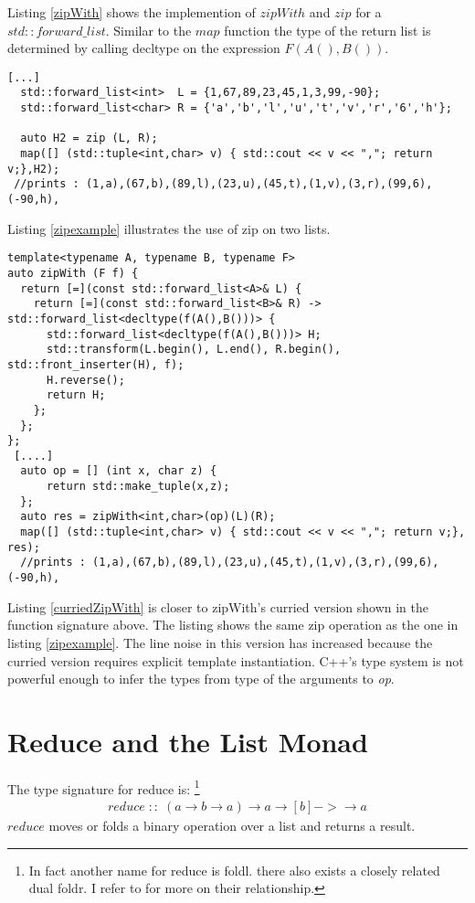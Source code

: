 \documentclass[12pt,fleqn]{article}
\begin{document}
Listing \ref{zipWith} shows the implemention of $zipWith$ and $zip$ for a $std::forward\_list$.
Similar to the $map$ function the type of the return list is determined by calling decltype on the expression $F(A(),B())$.
%
\begin{lstlisting}[caption=zipping two lists, label=zipexample ]
   [...]
  std::forward_list<int>  L = {1,67,89,23,45,1,3,99,-90};
  std::forward_list<char> R = {'a','b','l','u','t','v','r','6','h'};

  auto H2 = zip (L, R);
  map([] (std::tuple<int,char> v) { std::cout << v << ","; return v;},H2); 
 //prints : (1,a),(67,b),(89,l),(23,u),(45,t),(1,v),(3,r),(99,6),(-90,h),
\end{lstlisting}
Listing \ref{zipexample} illustrates the use of zip on two lists.
%
\begin{lstlisting}[caption=curried version of zipWith, label=curriedZipWith]
template<typename A, typename B, typename F>
auto zipWith (F f) {
  return [=](const std::forward_list<A>& L) {
    return [=](const std::forward_list<B>& R) -> std::forward_list<decltype(f(A(),B()))> {
      std::forward_list<decltype(f(A(),B()))> H;
      std::transform(L.begin(), L.end(), R.begin(), std::front_inserter(H), f);
      H.reverse();
      return H;
    };
  };
};
 [....]
  auto op = [] (int x, char z) {
      return std::make_tuple(x,z);
  };
  auto res = zipWith<int,char>(op)(L)(R);
  map([] (std::tuple<int,char> v) { std::cout << v << ","; return v;}, res);
  //prints : (1,a),(67,b),(89,l),(23,u),(45,t),(1,v),(3,r),(99,6),(-90,h),
\end{lstlisting}
%
Listing \ref{curriedZipWith} is closer to zipWith's curried version shown in the function signature above.
The listing shows the same zip operation as the one in listing \ref{zipexample}.
The line noise in this version has increased because the curried version  requires explicit template instantiation. 
C++'s type system is not powerful enough to infer the types from type of the arguments to {\em op}.
%
%
\section*{Reduce and the List Monad}
The type signature for reduce is:
\footnote{In fact another name for reduce is foldl. there also exists a closely related dual foldr.
I refer to \cite{bird, hutton} for more on their relationship.}
\begin{eqnarray*}
reduce \;::\; (a \rightarrow b \rightarrow a) \rightarrow a \rightarrow [b] -> \rightarrow a
\end{eqnarray*}
$reduce$ moves or folds a binary operation over a list and returns a result.
\end{document}
